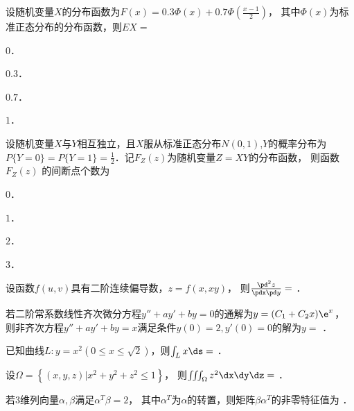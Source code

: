 \documentclass[plain,noanswer,medmath]{../../template/jnuexam}
\begin{document}
\begin{problem}
设随机变量$X$的分布函数为$F(x) = 0.3\Phi(x) + 0.7\Phi\left(\frac{x - 1}{2}\right)$，
其中$\Phi(x)$为标准正态分布的分布函数，则$EX =$\pickout{}
\begin{abcd}
\item $0$．
\item $0.3$．
\item $0.7$．
\item $1$．
\end{abcd}
\end{problem}


\begin{problem}
设随机变量$X$与$Y$相互独立，且$X$服从标准正态分布$N\left(0,1 \right)$,$Y$的概率分布为
$P\{Y = 0\} = P\{Y = 1\} = \frac{1}{2}$．记$F_Z(z)$为随机变量$Z = XY$的分布函数，
则函数$F_Z(z)$ 的间断点个数为\pickout{}
\begin{abcd}
\item $0$．
\item $1$．
\item $2$．
\item $3$．
\end{abcd}
\end{problem}




\begin{problem}
设函数$f\left(u,v \right)$具有二阶连续偏导数，$z = f(x,xy)$，
则$\frac{\pd^2 z}{\pdx\pd y}=$ \fillin{}．
\end{problem}


\begin{problem}
若二阶常系数线性齐次微分方程$y'' + ay' + by = 0$的通解为$y = (C_1 + C_2 x)\e^x$，
则非齐次方程$y'' + ay' + by = x$满足条件$y(0) = 2,y'(0) = 0$的解为$y =$ \fillin{}．
\end{problem}


\begin{problem}
已知曲线$L:y = x^2\left(0 \le x \le \sqrt{2} \right)$，则$\int_L x \ds =$ \fillin{}．
\end{problem}


\begin{problem}
设$\Omega = \left\{\left. \left(x,y,z \right) \right| x^2 + y^2 + z^2 \le 1 \right\}$，
则$\iiint_{\Omega}z^2 \dx\dy\dz =$ \fillin{}．
\end{problem}


\begin{problem}
若$3$维列向量$\alpha ,\beta$满足$\alpha^T\beta = 2$，
其中$\alpha^T$为$\alpha$的转置，则矩阵$\beta \alpha^T$的非零特征值为 \fillin{}．
\end{problem}
\end{document}

